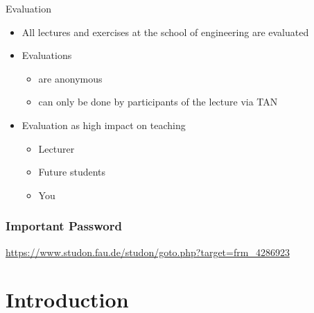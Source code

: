 \begin{frame}{Evaluation}
	\begin{itemize}
		\setlength\itemsep{0.3cm}
		\item All lectures and exercises at the school of engineering are evaluated
		\item Evaluations
		      \begin{itemize}
			      \item are anonymous
			      \item can only be done by participants of the lecture via TAN
		      \end{itemize}
		\item Evaluation as high impact on teaching
		      \begin{itemize}
			      \item Lecturer
			      \item Future students
			      \item You
		      \end{itemize}
	\end{itemize}
\end{frame}

\begin{frame}
	\frametitle{Important Password}

	\begin{center}
		\alert{\url{https://www.studon.fau.de/studon/goto.php?target=frm_4286923}}
	\end{center}
\end{frame}


\section{Introduction}

